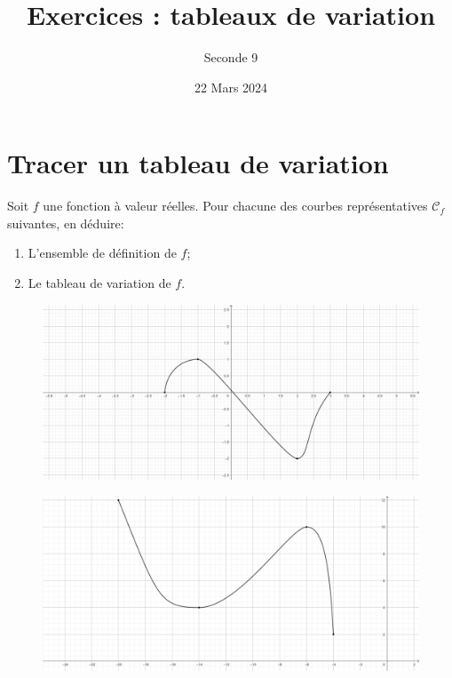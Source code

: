 \documentclass{article}
\title{Exercices : tableaux de variation}
\date{22 Mars 2024}
\author{Seconde 9}
\begin{document}
\maketitle
\thispagestyle{empty}
\section{Tracer un tableau de variation}
Soit $f$ une fonction à valeur réelles. Pour chacune des courbes représentatives $\mathcal{C}_f$ suivantes, en déduire:
\begin{enumerate}
\item L'ensemble de définition de $f$;
\item Le tableau de variation de $f$.
\end{enumerate}
\begin{figure}[h!]    
\begin{minipage}[t]{0.6\textwidth}
\includegraphics[width=\textwidth]{"fonction1.png"}
\end{minipage}
\begin{minipage}{0.4\textwidth}
    
\end{minipage}
\end{figure}

\begin{figure}[h!]
\begin{minipage}[t]{0.6\textwidth}
\includegraphics[width=\textwidth]{"fonction2.png"}
\end{minipage}
\begin{minipage}{0.4\textwidth}

\end{minipage}
\end{figure}
\end{document}
